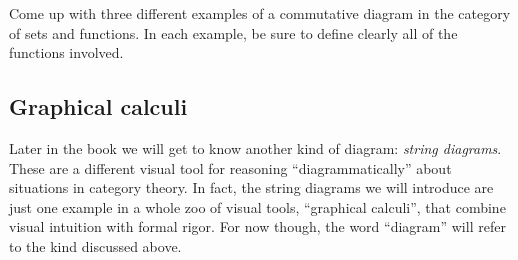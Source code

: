 
\begin{gradedexercise}
    \label{ex:InventingCommDiagrams}

    Come up with three different examples of a commutative diagram in the category of sets and functions.
    In each example, be sure to define clearly all of the functions involved.

\end{gradedexercise}


\subsection{Graphical calculi}

Later in the book we will get to know another kind of diagram: \emph{string diagrams}.
These are a different visual tool for reasoning ``diagrammatically'' about situations in category theory.
In fact, the string diagrams we will introduce are just one example in a whole zoo of visual tools, ``graphical calculi'', that combine visual intuition with formal rigor.
For now though, the word ``diagram'' will refer to the kind discussed above.



